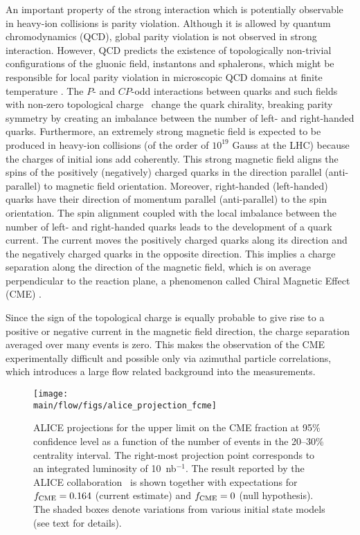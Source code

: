 An important property of the strong interaction which is potentially observable in heavy-ion collisions is parity violation. Although it is allowed by 
quantum chromodynamics (QCD), global parity violation is not observed in strong interaction. However, QCD predicts the existence of topologically 
non-trivial configurations of the gluonic field, instantons and sphalerons, which might be responsible for local parity violation in microscopic QCD 
domains at finite temperature \cite{Lee:1973iz, Lee:1974ma, Morley:1983wr, Kharzeev:1998kz}. The $P$- and $CP$-odd interactions between quarks 
and such fields with non-zero topological charge~\cite{Chern:1974ft} change the quark chirality, breaking parity symmetry by creating an imbalance 
between the number of left- and right-handed quarks. Furthermore, an extremely strong magnetic field is expected to be produced in heavy-ion collisions 
\cite{Deng:2012pc, Gursoy:2014aka} (of the order of $10^{19}$ Gauss at the LHC) because the charges of initial ions add coherently. This strong 
magnetic field aligns the spins of the positively (negatively) charged quarks in the direction parallel (anti-parallel) to magnetic field orientation. Moreover, 
right-handed (left-handed) quarks have their direction of momentum parallel (anti-parallel) to the spin orientation. The spin alignment coupled with the 
local imbalance between the number of left- and right-handed quarks leads to the development of a quark current. The current moves the positively 
charged quarks along its direction and the negatively charged quarks in the opposite direction. This implies a charge separation along the direction 
of the magnetic field, which is on average perpendicular to the reaction plane, %
a phenomenon called Chiral Magnetic Effect (CME) \cite{Kharzeev:2004ey, Kharzeev:2007tn, Kharzeev:2007jp, Fukushima:2008xe}. 

Since the sign of 
the topological charge is equally probable to give rise to a positive or negative current in the magnetic field direction, the charge separation averaged 
over many events is zero. This makes the observation of the CME experimentally difficult and possible only via azimuthal particle correlations, which 
introduces a large flow related background into the measurements.

\begin{figure}[!ht]
\begin{center}
\texttt{[image: \\main/flow/figs/alice\_projection\_fcme]}
\caption{
ALICE projections for the upper limit on the CME fraction at 95\% confidence 
  level as a function of the number of events in the 20--30\% 
  centrality interval.
The right-most projection point corresponds to an integrated luminosity 
  of 10~nb$^{-1}$.
The result reported by the ALICE collaboration~\cite{Acharya:2017fau} 
  is shown together with expectations for $f_{\rm CME}=0.164$ (current estimate) 
  and $f_{\rm CME}=0$ (null hypothesis). 
The shaded boxes denote variations from various initial 
  state models (see text for details).
}
\label{fig:alice_fcme}
\end{center}
\end{figure}

